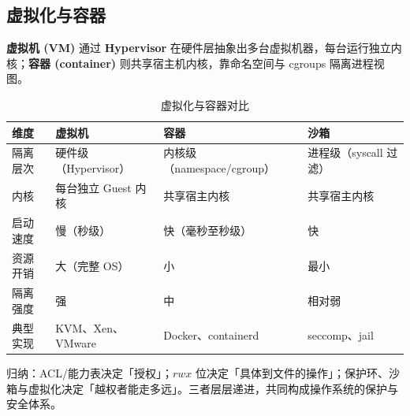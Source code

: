 \subsection{虚拟化与容器}

\textbf{虚拟机 (VM)} 通过 \textbf{Hypervisor} 在硬件层抽象出多台虚拟机器，每台运行独立内核；\textbf{容器 (container)} 则共享宿主机内核，靠命名空间与 cgroups 隔离进程视图。

\begin{table}[H]
\centering
\caption{虚拟化与容器对比}
\begin{tabulary}{\textwidth}{LLLL}
\toprule
维度 & 虚拟机 & 容器 & 沙箱 \\
\midrule
隔离层次 & 硬件级（Hypervisor） & 内核级（namespace/cgroup） & 进程级（syscall 过滤） \\
内核 & 每台独立 Guest 内核 & 共享宿主内核 & 共享宿主内核 \\
启动速度 & 慢（秒级） & 快（毫秒至秒级） & 快 \\
资源开销 & 大（完整 OS） & 小 & 最小 \\
隔离强度 & 强 & 中 & 相对弱 \\
典型实现 & KVM、Xen、VMware & Docker、containerd & seccomp、jail \\
\bottomrule
\end{tabulary}
\end{table}

\noindent 归纳：ACL/能力表决定「授权」；$rwx$ 位决定「具体到文件的操作」；保护环、沙箱与虚拟化决定「越权者能走多远」。三者层层递进，共同构成操作系统的保护与安全体系。
